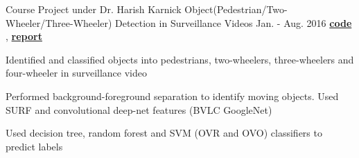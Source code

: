 \begin{cventries}
	
	\cventry
	{Course Project under Dr. Harish Karnick} %
	{Object(Pedestrian/Two-Wheeler/Three-Wheeler) Detection in Surveillance Videos} %
	{Jan. - Aug. 2016} %
	{
		\textbf{\href{https://github.com/submagr/MLT-Classifier}{code \ExternalLink}}, 
		\textbf{\href{https://www.dropbox.com/s/sh69si90hl7mtxr/MLTProjectReport.pdf?dl=0}{report \ExternalLink}}	
	} %
	{
		\begin{cvitems} %
			\item {Identified and classified objects into pedestrians, two-wheelers, three-wheelers and four-wheeler in surveillance video}
			\item {Performed background-foreground separation to identify moving objects. Used SURF and convolutional deep-net features (BVLC GoogleNet)}
			\item {Used decision tree, random forest and SVM (OVR and OVO) classifiers to predict labels}
		\end{cvitems}
	}
%	
%	
%	

\end{cventries}
